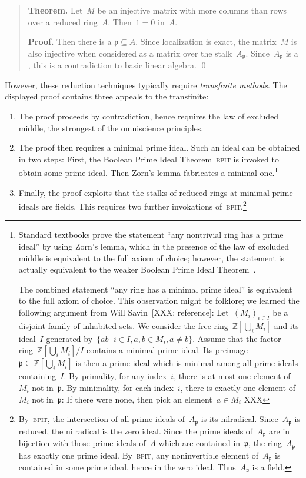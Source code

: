 \documentclass{ws-rv9x6}
\newcommand{\ZZ}{\mathbb{Z}}
\newcommand{\ppp}{\mathfrak{p}}
\renewcommand{\_}{\mathpunct{.}}
\newcommand{\?}{\,{:}\,}
\newcommand{\BPIT}{\textsc{bpit}\xspace}
\begin{document}
\begin{quote}
\textbf{Theorem.} Let~$M$ be an injective matrix with more columns than rows
over a reduced ring~$A$. Then~$1 = 0$ in~$A$.

\textbf{Proof.}  Then there is a  $\ppp \subseteq A$. Since localization is exact, the matrix~$M$ is also injective when
considered as a matrix over the stalk~$A_\ppp$. Since~$A_\ppp$ is a
, this is a contradiction to basic linear algebra. \qed
\end{quote}

However, these reduction techniques typically require \emph{transfinite
methods}. The displayed proof contains three appeals to the transfinite:
\begin{enumerate}
\item The proof proceeds by contradiction, hence requires the law of excluded
middle, the strongest of the omniscience principles.
\item The proof then requires a minimal prime ideal. Such an ideal can be
obtained in two steps: First, the Boolean Prime Ideal
Theorem~\BPIT is invoked to obtain some prime ideal. Then
Zorn's lemma fabricates a minimal one.\footnote{Standard textbooks prove the statement ``any nontrivial
ring has a prime ideal'' by using Zorn's lemma, which
in the presence of the law of excluded middle is equivalent to the full axiom
of choice; however, the statement is actually equivalent to the weaker Boolean
Prime Ideal Theorem~\cite{scott:bpit,banaschewski-harting:lattice-aspects}.

The combined statement ``any ring has a minimal prime ideal'' is equivalent to
the full axiom of choice. This observation might be folklore; we learned the
following argument from Will Savin~[XXX: reference]: Let~$(M_i)_{i \in I}$ be a
disjoint family of inhabited sets. We consider the free ring~$\ZZ[\bigcup_i M_i]$ and
its ideal~$I$ generated by~$\{ ab \,|\, i \in I, a,b \in M_i, a \neq b \}$. Assume
that the factor ring~$\ZZ[\bigcup_i M_i]/I$ contains a minimal prime ideal. Its
preimage~$\ppp \subseteq \ZZ[\bigcup_i M_i]$ is then a prime ideal which is
minimal among all prime ideals containing~$I$. By primality, for any index~$i$,
there is at most one element of~$M_i$ not in~$\ppp$. By minimality, for each
index~$i$, there is exactly one element of~$M_i$ not in~$\ppp$: If there were
none, then pick an element~$a \in M_i$ XXX}
\item Finally, the proof exploits that the stalks of reduced rings at minimal
prime ideals are fields. This requires two further invokations
of~\BPIT.\footnote{By~\BPIT, the intersection of all prime ideals of~$A_\ppp$
is its nilradical. Since~$A_\ppp$ is reduced, the nilradical is the zero ideal.
Since the prime ideals of~$A_\ppp$ are in bijection with those prime ideals
of~$A$ which are contained in~$\ppp$, the ring~$A_\ppp$ has exactly one prime
ideal. By~\BPIT, any noninvertible element of~$A_\ppp$ is contained in some
prime ideal, hence in the zero ideal. Thus~$A_\ppp$ is a field.}
\end{enumerate}
\end{document}
